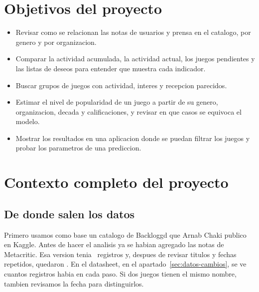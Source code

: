 \newcommand{\ReferenciaFigura}[1]{\begingroup\hypersetup{linkcolor=black}\hyperref[#1]{\underline{\ref*{#1}}}\endgroup}

\section{Objetivos del proyecto}
\begin{itemize}
\item Revisar como se relacionan las notas de usuarios y prensa en el catalogo, por genero y por organizacion.
\item Comparar la actividad acumulada, la actividad actual, los juegos pendientes y las listas de deseos para entender que muestra cada indicador.
\item Buscar grupos de juegos con actividad, interes y recepcion parecidos.
\item Estimar el nivel de popularidad de un juego a partir de su genero, organizacion, decada y calificaciones, y revisar en que casos se equivoca el modelo.
\item Mostrar los resultados en una aplicacion donde se puedan filtrar los juegos y probar los parametros de una prediccion.
\end{itemize}

\section{Contexto completo del proyecto}
\subsection{De donde salen los datos}
Primero usamos como base un catalogo de Backloggd que Arnab Chaki publico en Kaggle. Antes de hacer el analisis ya se habian agregado las notas de Metacritic. Esa version tenia \Historico\ registros y, despues de revisar titulos y fechas repetidos, quedaron \Catalogo. En el datasheet, en el apartado~\ref{sec:datos-cambios}, se ve cuantos registros habia en cada paso. Si dos juegos tienen el mismo nombre, tambien revisamos la fecha para distinguirlos.

